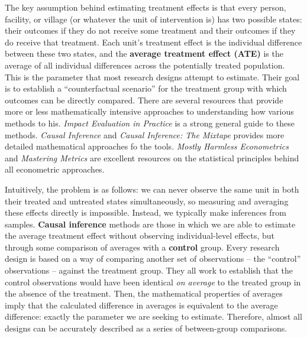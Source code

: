 The key assumption behind estimating treatment effects is that every
person, facility, or village (or whatever the unit of intervention is)
has two possible states: their outcomes if they do not receive some treatment
and their outcomes if they do receive that treatment.
Each unit's treatment effect is the individual difference between these two states,
and the \textbf{average treatment effect (ATE)} is the average of all
individual differences across the potentially treated population.
This is the parameter that most research designs attempt to estimate.
Their goal is to establish a ``counterfactual scenario'' for the treatment group
with which outcomes can be directly compared.
There are several resources that provide more or less mathematically intensive
approaches to understanding how various methods to his.
\textit{Impact Evaluation in Practice} is a strong general guide to these methods.
\textit{Causal Inference} and \textit{Causal Inference: The Mixtape}
provides more detailed mathematical approaches fo the tools.
\textit{Mostly Harmless Econometrics} and \textit{Mastering Metrics}
are excellent resources on the statistical principles behind all econometric approaches.

Intuitively, the problem is as follows: we can never observe the same unit
in both their treated and untreated states simultaneously,
so measuring and averaging these effects directly is impossible.
Instead, we typically make inferences from samples.
\textbf{Causal inference} methods are those in which we are able to estimate the
average treatment effect without observing individual-level effects,
but through some comparison of averages with a \textbf{control} group.
Every research design is based on a way of comparing another set of observations --
the ``control'' observations -- against the treatment group.
They all work to establish that the control observations would have been
identical \textit{on average} to the treated group in the absence of the treatment.
Then, the mathematical properties of averages imply that the calculated
difference in averages is equivalent to the average difference:
exactly the parameter we are seeking to estimate.
Therefore, almost all designs can be accurately described
as a series of between-group comparisons.

